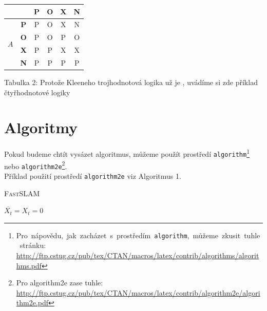 \documentclass[a4paper, 11pt]{article}
\begin{document}
\begin{table}[ht]
\begin{center}
\begin{tabular}{|c|c|c|c|c|c|}
        \multicolumn{2}{|c|}{}   & \textbf{P} & \textbf{O} & \textbf{X} & \textbf{N} \\\hline
        \multirow{4}{*}{$ A $}& \textbf{P} & P & O & X & N \\\cline{2-6} 
                              & \textbf{O }& P & O & P & O \\ \cline{2-6} 
                              & \textbf{X} & P & P & X & X \\ \cline{2-6} 
                              & \textbf{N} & P & P & P & P \\ \hline
        \end{tabular}
        \end{center}
        \end{table}
        
        
    Tabulka 2: Protože Kleeneho trojhodnotová logika už je , uvádíme si zde příklad čtyřhodnotové logiky
\newpage
\section{Algoritmy}
    Pokud budeme chtít vysázet algoritmus, můžeme použít prostředí \verb|algorithm|\footnote{
    \mbox{Pro nápovědu, jak zacházet s prostředím \texttt{algorithm}, můžeme zkusit tuhle stránku:}\\
    \href{http://ftp.cstug.cz/pub/tex/CTAN/macros/latex/contrib/algorithms/algorithms.pdf}{http://ftp.cstug.cz/pub/tex/CTAN/macros/latex/contrib/algorithms/algorithms.pdf}} nebo \verb|algorithm2e|\footnote{Pro algorithm2e zase tuhle:
    \href{http://ftp.cstug.cz/pub/tex/CTAN/macros/latex/contrib/algorithm2e/algorithm2e.pdf}{http://ftp.cstug.cz/pub/tex/CTAN/macros/latex/contrib/algorithm2e/algorithm2e.pdf}}. \\
    Příklad použití prostředí \verb|algorithm2e| viz Algoritmus 1.

\begin{algorithm}

    \caption{\textsc{FastSLAM}}
    \BlankLine
    $\overline{X_{t}}=X_{t}=0$\\
\end{algorithm}
\end{document}
